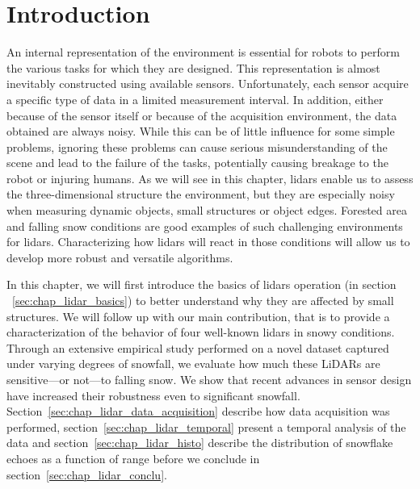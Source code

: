 \section{Introduction}
\label{sec:chap_lidar_intro}

An internal representation of the environment is essential for robots to perform the various tasks for which they are designed. This representation is almost inevitably constructed using available sensors. Unfortunately, each sensor acquire a specific type of data in a limited measurement interval. In addition, either because of the sensor itself or because of the acquisition environment, the data obtained are always noisy. While this can be of little influence for some simple problems, ignoring these problems can cause serious misunderstanding of the scene and lead to the failure of the tasks, potentially causing breakage to the robot or injuring humans. As we will see in this chapter, \gls*{lidar}s enable us to assess the three-dimensional structure the environment, but they are especially noisy when measuring dynamic objects, small structures or object edges. Forested area and falling snow conditions are good examples of such challenging environments for \gls*{lidar}s. Characterizing how \gls*{lidar}s will react in those conditions will allow us to develop more robust and versatile algorithms.

In this chapter, we will first introduce the basics of \gls*{lidar}s operation (in section ~\ref{sec:chap_lidar_basics}) to better understand why they are affected by small structures. We will follow up with our main contribution, that is to provide a characterization of the behavior of four well-known \gls*{lidar}s in snowy conditions. Through an extensive empirical study performed on a novel dataset captured under varying degrees of snowfall, we evaluate how much these LiDARs are sensitive---or not---to falling snow. We show that recent advances in sensor design have increased their robustness even to significant snowfall. Section~\ref{sec:chap_lidar_data_acquisition} describe how data acquisition was performed, section~\ref{sec:chap_lidar_temporal} present a temporal analysis of the data and section~\ref{sec:chap_lidar_histo} describe the distribution of snowflake echoes as a function of range before we conclude in section~\ref{sec:chap_lidar_conclu}. 

